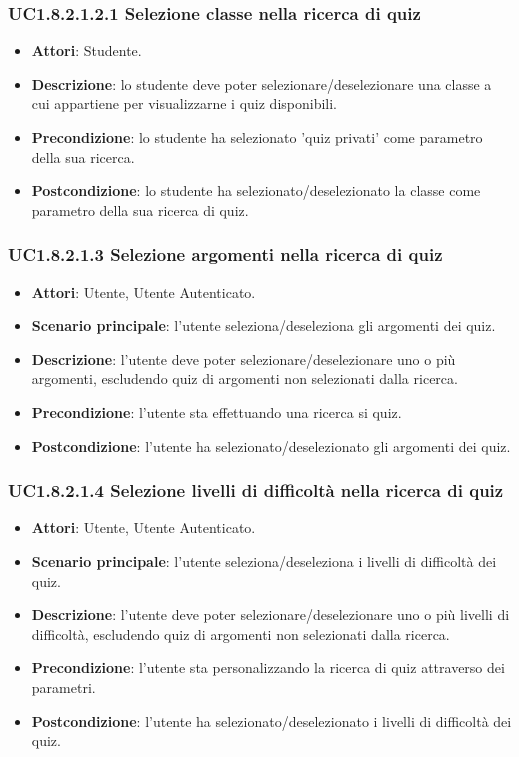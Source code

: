 \subsubsection{UC1.8.2.1.2.1 Selezione classe nella ricerca di quiz}
\begin{itemize}
\item \textbf{Attori}: Studente.
\item \textbf{Descrizione}: lo studente deve poter selezionare/deselezionare una classe a cui appartiene per visualizzarne i quiz disponibili.
\item \textbf{Precondizione}: lo studente ha selezionato 'quiz privati' come parametro della sua ricerca.
\item \textbf{Postcondizione}: lo studente ha selezionato/deselezionato la classe come parametro della sua ricerca di quiz.
\end{itemize}
\subsubsection{UC1.8.2.1.3 Selezione argomenti nella ricerca di quiz}
\begin{itemize}
\item \textbf{Attori}: Utente, Utente Autenticato.
\item \textbf{Scenario principale}: l'utente seleziona/deseleziona gli argomenti dei quiz.
\item \textbf{Descrizione}: l'utente deve poter selezionare/deselezionare uno o più argomenti, escludendo quiz di argomenti non selezionati dalla ricerca.
\item \textbf{Precondizione}: l'utente sta effettuando una ricerca si quiz.
\item \textbf{Postcondizione}: l'utente ha selezionato/deselezionato gli argomenti dei quiz.
\end{itemize}
\subsubsection{UC1.8.2.1.4 Selezione livelli di difficoltà nella ricerca di quiz}
\begin{itemize}
\item \textbf{Attori}: Utente, Utente Autenticato.
\item \textbf{Scenario principale}: l'utente seleziona/deseleziona i livelli di difficoltà dei quiz.
\item \textbf{Descrizione}: l'utente deve poter selezionare/deselezionare uno o più livelli di difficoltà, escludendo quiz di argomenti non selezionati dalla ricerca.
\item \textbf{Precondizione}: l'utente sta personalizzando la ricerca di quiz attraverso dei parametri.
\item \textbf{Postcondizione}: l'utente ha selezionato/deselezionato i livelli di difficoltà dei quiz.
\end{itemize}
